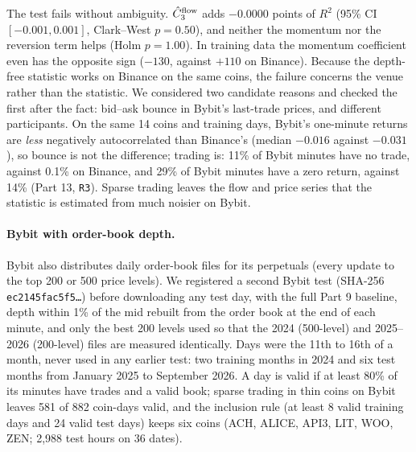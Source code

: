 The test fails without ambiguity. $\hat C_3^{\rm flow}$ adds $-0.0000$ points of $R^2$ (95\% CI $[-0.001,0.001]$, Clark--West $p=0.50$), and neither the momentum nor the reversion term helps (Holm $p=1.00$). In training data the momentum coefficient even has the opposite sign ($-130$, against $+110$ on Binance). Because the depth-free statistic works on Binance on the same coins, the failure concerns the venue rather than the statistic. We considered two candidate reasons and checked the first after the fact: bid--ask bounce in Bybit's last-trade prices, and different participants. On the same 14 coins and training days, Bybit's one-minute returns are \emph{less} negatively autocorrelated than Binance's (median $-0.016$ against $-0.031$), so bounce is not the difference; trading is: 11\% of Bybit minutes have no trade, against 0.1\% on Binance, and 29\% of Bybit minutes have a zero return, against 14\% (Part 13, \texttt{R3}). Sparse trading leaves the flow and price series that the statistic is estimated from much noisier on Bybit.


\paragraph{Bybit with order-book depth.} Bybit also distributes daily order-book files for its perpetuals (every update to the top 200 or 500 price levels). We registered a second Bybit test (SHA-256 \texttt{ec2145fac5f5\ldots}) before downloading any test day, with the full Part 9 baseline, depth within 1\% of the mid rebuilt from the order book at the end of each minute, and only the best 200 levels used so that the 2024 (500-level) and 2025--2026 (200-level) files are measured identically. Days were the 11th to 16th of a month, never used in any earlier test: two training months in 2024 and six test months from January 2025 to September 2026. A day is valid if at least 80\% of its minutes have trades and a valid book; sparse trading in thin coins on Bybit leaves 581 of 882 coin-days valid, and the inclusion rule (at least 8 valid training days and 24 valid test days) keeps six coins (ACH, ALICE, API3, LIT, WOO, ZEN; 2{,}988 test hours on 36 dates).

